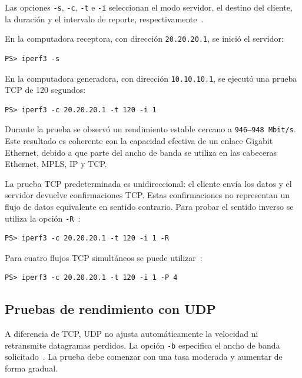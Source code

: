 Las opciones \texttt{-s}, \texttt{-c}, \texttt{-t} e \texttt{-i} seleccionan
el modo servidor, el destino del cliente, la duración y el intervalo de
reporte, respectivamente~\cite{esnet-iperf3-manual}.

En la computadora receptora, con dirección \texttt{20.20.20.1}, se inició
el servidor:

\begin{lstlisting}[style=terminal]
PS> iperf3 -s
\end{lstlisting}

En la computadora generadora, con dirección \texttt{10.10.10.1}, se ejecutó
una prueba TCP de 120 segundos:

\begin{lstlisting}[style=terminal]
PS> iperf3 -c 20.20.20.1 -t 120 -i 1
\end{lstlisting}

Durante la prueba se observó un rendimiento estable cercano a
\texttt{946--948 Mbit/s}. Este resultado es coherente con la capacidad efectiva
de un enlace Gigabit Ethernet, debido a que parte del ancho de banda se utiliza
en las cabeceras Ethernet, MPLS, IP y TCP.

La prueba TCP predeterminada es unidireccional: el cliente envía los datos y
el servidor devuelve confirmaciones TCP. Estas confirmaciones no representan
un flujo de datos equivalente en sentido contrario. Para probar el sentido
inverso se utiliza la opción \texttt{-R}~\cite{esnet-iperf3-manual}:

\begin{lstlisting}[style=terminal]
PS> iperf3 -c 20.20.20.1 -t 120 -i 1 -R
\end{lstlisting}

Para cuatro flujos TCP simultáneos se puede utilizar~\cite{esnet-iperf3-manual}:

\begin{lstlisting}[style=terminal]
PS> iperf3 -c 20.20.20.1 -t 120 -i 1 -P 4
\end{lstlisting}

\subsection{Pruebas de rendimiento con UDP}

A diferencia de TCP, UDP no ajusta automáticamente la velocidad ni
retransmite datagramas perdidos. La opción \texttt{-b} especifica el ancho de
banda solicitado~\cite{esnet-iperf3-manual}. La prueba debe comenzar con una tasa moderada y aumentar de
forma gradual.

